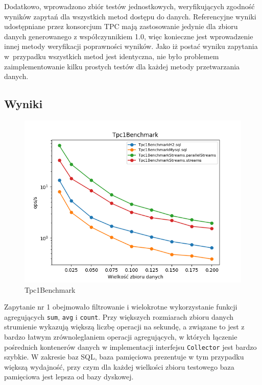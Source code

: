 \documentclass[12pt,twoside,openright]{extarticle}
\begin{document}
    Dodatkowo, wprowadzono zbiór testów jednostkowych, weryfikujących zgodność wyników zapytań dla wszystkich metod dostępu do danych. Referencyjne wyniki \cite{tpcresults} udostępniane przez konsorcjum TPC mają zastosowanie jedynie dla zbioru danych generowanego z współczynnikiem 1.0, więc konieczne jest wprowadzenie innej metody weryfikacji poprawności wyników. Jako iż postać wyniku zapytania w~przypadku wszystkich metod jest identyczna, nie było problemem zaimplementowanie kilku prostych testów dla każdej metody przetwarzania danych.


\newpage
\subsection{Wyniki}

\begin{figure}[h]
\centering
\includegraphics[width=15cm]{plots/Tpc1Benchmark}
\caption{Tpc1Benchmark}
\end{figure}

    Zapytanie nr 1 obejmowało filtrowanie i wielokrotne wykorzystanie funkcji agregujących \texttt{sum}, \texttt{avg} i \texttt{count}. Przy większych rozmiarach zbioru danych strumienie wykazują większą liczbę operacji na sekundę, a związane to jest z bardzo łatwym zrównoleglaniem operacji agregujących, w których łączenie pośrednich kontenerów danych w implementacji interfejsu \texttt{Collector} jest bardzo szybkie. W zakresie baz SQL, baza pamięciowa prezentuje w tym przypadku większą wydajność, przy czym dla każdej wielkości zbioru testowego baza pamięciowa jest lepsza od bazy dyskowej. 
\end{document}
